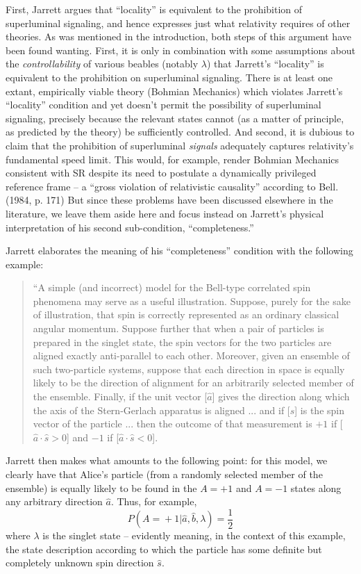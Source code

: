\documentclass[aps,prc,twocolumn]{revtex4}
\begin{document}
First, Jarrett argues that ``locality'' is equivalent to the
prohibition of superluminal signaling, and 
hence expresses just what relativity requires of other theories.  As
was mentioned in the introduction, both steps of this argument have
been found wanting.  First, it is only in combination with some assumptions
about the \emph{controllability} of various beables (notably
$\lambda$) that Jarrett's ``locality'' is equivalent to the
prohibition on superluminal signaling.  There is at least one
extant, empirically viable theory (Bohmian Mechanics) which violates
Jarrett's ``locality'' condition and yet doesn't permit the
possibility of superluminal signaling, precisely because the relevant
states cannot (as a matter of principle, as predicted by the
theory) be sufficiently controlled.  And second, it is dubious to
claim that the prohibition of superluminal \emph{signals} adequately
captures relativity's fundamental speed limit.  This would, for
example, render Bohmian Mechanics consistent with SR despite its need
to postulate a dynamically privileged reference frame -- a ``gross
violation of relativistic causality'' according to Bell. (1984, p. 171)
But since these
problems have been discussed elsewhere in the literature, we leave
them aside here and focus instead on Jarrett's physical interpretation
of his second sub-condition, ``completeness.''  

Jarrett elaborates the meaning of his ``completeness'' condition with
the following example:
\begin{quote}
``A simple (and incorrect) model for the Bell-type correlated spin
phenomena may serve as a useful illustration.  Suppose, purely for the
sake of illustration, that spin is correctly represented as an
ordinary classical angular momentum.  Suppose further that when a pair
of particles is prepared in the singlet state, the spin vectors for
the two particles are aligned exactly anti-parallel to each other.
Moreover, given an ensemble of such two-particle systems, suppose that
each direction in space is equally likely to be the direction of
alignment for an arbitrarily selected member of the ensemble.
Finally, if the unit vector [$\hat{a}$] gives the direction along
which the
axis of the Stern-Gerlach apparatus is aligned ... and if [$\hat{s}$]
is the spin vector of the particle ... then the outcome of that
measurement is $+1$ if [$\hat{a}\cdot \hat{s} > 0$] and $-1$ if
[$\hat{a}\cdot \hat{s} < 0$].  
\end{quote}
Jarrett then makes what amounts to the following point:  for this
model, we clearly have that Alice's particle (from a randomly selected
member of the ensemble) is equally likely
to be found in the $A = +1$ and $A = -1$ states along any arbitrary
direction $\hat{a}$.  Thus, for example,
\begin{equation}
P (A \! = \! +1 | \hat{a}, \hat{b}, \lambda) = \frac{1}{2}
\label{eq:comp1}
\end{equation}
where $\lambda$ is the singlet state -- evidently meaning, in the context of
this example, the state description according to which the particle has
some definite but completely unknown spin direction $\hat{s}$.  
\end{document}
